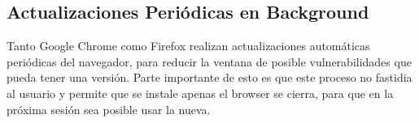 



 \subsection{Actualizaciones Periódicas en Background}
 Tanto Google Chrome \cite{reis2009browser} como Firefox realizan actualizaciones automáticas periódicas del navegador, para reducir la ventana de posible vulnerabilidades que pueda tener una versión. Parte importante de esto es que este proceso no fastidia al usuario y permite que se instale apenas el browser se cierra, para que en la próxima sesión sea posible usar la nueva.

